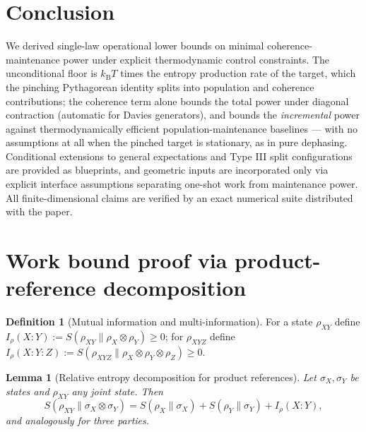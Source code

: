 \documentclass[11pt,a4paper]{article}
\theoremstyle{plain}
\newtheorem{lemma}[theorem]{Lemma}
\theoremstyle{definition}
\newtheorem{definition}[theorem]{Definition}
\theoremstyle{remark}
\newcommand{\kB}{k_{\mathrm{B}}}
\begin{document}
\section{Conclusion}

We derived single-law operational lower bounds on minimal coherence-maintenance
power under explicit thermodynamic control constraints. The unconditional floor
is $\kB T$ times the entropy production rate of the target, which the pinching
Pythagorean identity splits into population and coherence contributions; the
coherence term alone bounds the total power under diagonal contraction
(automatic for Davies generators), and bounds the \emph{incremental} power
against thermodynamically efficient population-maintenance baselines --- with
no assumptions at all when the pinched target is stationary, as in pure
dephasing. Conditional extensions to general expectations and Type III split
configurations are provided as blueprints, and geometric inputs are
incorporated only via explicit interface assumptions separating one-shot work
from maintenance power. All finite-dimensional claims are verified by an exact
numerical suite distributed with the paper.

\appendix

\section{Work bound proof via product-reference decomposition}
\label{app:workproof}

\begin{definition}[Mutual information and multi-information]
For a state $\rho_{XY}$ define
$I_\rho(X : Y) := S(\rho_{XY}\|\rho_X \otimes \rho_Y) \ge 0$; for
$\rho_{XYZ}$ define
$I_\rho(X : Y : Z) := S(\rho_{XYZ}\|\rho_X \otimes \rho_Y \otimes \rho_Z)
\ge 0$.
\end{definition}

\begin{lemma}[Relative entropy decomposition for product references]
\label{lem:decomp}
Let $\sigma_X, \sigma_Y$ be states and $\rho_{XY}$ any joint state. Then
\begin{equation}
S(\rho_{XY}\|\sigma_X \otimes \sigma_Y) = S(\rho_X\|\sigma_X) +
S(\rho_Y\|\sigma_Y) + I_\rho(X : Y),
\end{equation}
and analogously for three parties.
\end{lemma}
\end{document}
